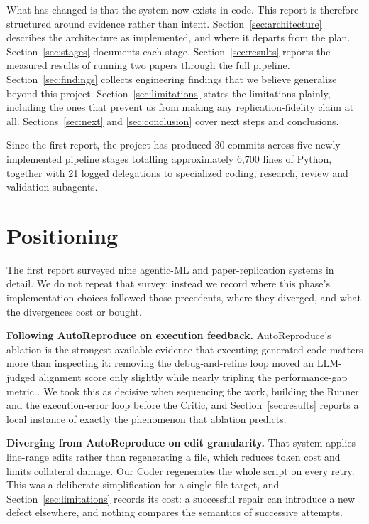 \documentclass[11pt]{article}
\begin{document}
What has changed is that the system now exists in code. This report is therefore
structured around evidence rather than intent. Section~\ref{sec:architecture} describes
the architecture as implemented, and where it departs from the plan.
Section~\ref{sec:stages} documents each stage. Section~\ref{sec:results} reports the
measured results of running two papers through the full pipeline.
Section~\ref{sec:findings} collects engineering findings that we believe generalize
beyond this project. Section~\ref{sec:limitations} states the limitations plainly,
including the ones that prevent us from making any replication-fidelity claim at all.
Sections~\ref{sec:next} and \ref{sec:conclusion} cover next steps and conclusions.

Since the first report, the project has produced 30 commits across five newly implemented
pipeline stages totalling approximately 6{,}700 lines of Python, together with 21 logged
delegations to specialized coding, research, review and validation subagents.


\section{Positioning}
\label{sec:related}

The first report surveyed nine agentic-ML and paper-replication systems in detail. We do
not repeat that survey; instead we record where this phase's implementation choices
followed those precedents, where they diverged, and what the divergences cost or bought.

\textbf{Following AutoReproduce on execution feedback.} AutoReproduce's ablation is the
strongest available evidence that executing generated code matters more than inspecting
it: removing the debug-and-refine loop moved an LLM-judged alignment score only slightly
while nearly tripling the performance-gap metric \cite{zhao2025autoreproduce}. We took
this as decisive when sequencing the work, building the Runner and the execution-error
loop before the Critic, and Section~\ref{sec:results} reports a local instance of exactly
the phenomenon that ablation predicts.

\textbf{Diverging from AutoReproduce on edit granularity.} That system applies
line-range edits rather than regenerating a file, which reduces token cost and limits
collateral damage. Our Coder regenerates the whole script on every retry. This was a
deliberate simplification for a single-file target, and Section~\ref{sec:limitations}
records its cost: a successful repair can introduce a new defect elsewhere, and nothing
compares the semantics of successive attempts.
\end{document}
